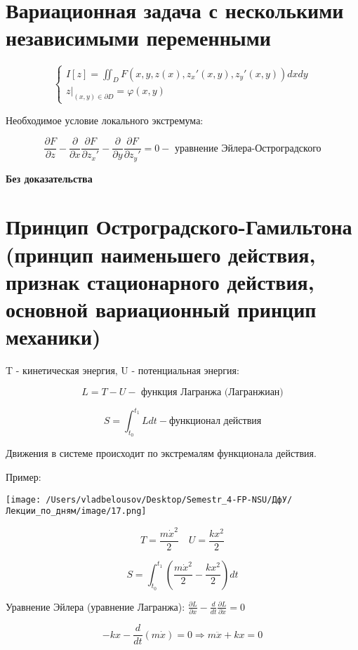 \documentclass[12pt, a4paper]{report}
\begin{document}
\section{Вариационная задача с несколькими независимыми переменными}

\[ \begin{cases}
    \displaystyle I [ z] = \iint_{D } F (x, y , z(x ), z_x ' ( x,y), z_y ' ( x,y )) dx dy \\
    \displaystyle z  | _{(x,y ) \in  \partial D } = \varphi ( x,y)
\end{cases} \] 

Необходимое условие локального экстремума: 

\[ \frac{\partial  F }{ \partial z } - \frac{\partial  }{\partial  x } \frac{\partial  F }{ \partial z_x ' } - \frac{\partial  }{\partial  y } \frac{\partial  F }{ \partial z_y ' } = 0    - \text{ уравнение Эйлера-Остроградского}   \] 

\textbf{Без доказательства} 

\section{Принцип Остроградского-Гамильтона (принцип наименьшего действия, признак стационарного действия, основной вариационный принцип механики)}

T - кинетическая энергия, U - потенциальная энергия: 

\[ L = T - U - \text{ функция Лагранжа (Лагранжиан)}  \] 

\[ S = \int_{t_0 }^{t_1} L dt - \text{функционал действия}  \] 

Движения в системе происходит  по экстремалям функционала действия. 

Пример: 

\begin{center}
    \texttt{[image: /Users/vladbelousov/Desktop/Semestr\_4-FP-NSU/ДфУ/Лекции\_по\_дням/image/17.png]}
\end{center}

\[ T = \frac{m \dot{x } ^2 }{2} \quad  U = \frac{k x ^2 }{2}  \] 

\[ S = \int_{t_0 }^{t_1} \left( \frac{m \dot{x } ^2 }{2} -  \frac{k x ^2 }{2}\right)  dt \] 

Уравнение Эйлера (уравнение Лагранжа): \( \displaystyle  \frac{\partial L }{ \partial x  } - \frac{d}{dt} \frac{\partial L }{ \partial \dot{x}  } = 0  \) 

\[ - kx - \frac{d}{dt } ( m \dot{x } ) = 0  \Rightarrow m \ddot{x} + kx = 0  \] 
\end{document}
